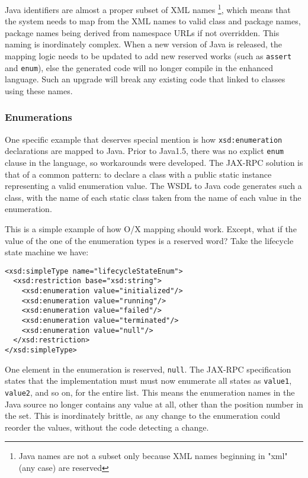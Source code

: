Java identifiers are almost a proper subset of XML names
\footnote{Java names are not a subset only because XML names beginning in "xml" (any case) are reserved},
which means that the system needs to map from the XML names to valid
class and package names, package names being derived from namespace URLs
if not overridden. This naming is inordinately complex. When a new version
of Java is released, the mapping logic needs to be updated to add new
reserved works (such as {\tt assert} and {\tt enum}), else the
generated code will no longer compile in the enhanced language. Such an
upgrade will break any existing code that linked to classes using these
names. 


\subsubsection{Enumerations}

One specific example that deserves special mention is how
{\tt xsd:enumeration} declarations are mapped to Java. Prior to
Java1.5, there was no explict {\tt enum} clause in the language, so
workarounds were developed. The JAX-RPC solution is that of a common
pattern: to declare a class with a public static instance representing
a valid enumeration value. The WSDL to Java code generates such a
class, with the name of each static class taken from the name of each
value in the enumeration. 

This is a simple example of how O/X mapping should work. Except, what if the
value of the one of the enumeration types is a reserved word?
Take the lifecycle state machine we have:

\begin{verbatim}
<xsd:simpleType name="lifecycleStateEnum">
  <xsd:restriction base="xsd:string"> 
    <xsd:enumeration value="initialized"/> 
    <xsd:enumeration value="running"/> 
    <xsd:enumeration value="failed"/> 
    <xsd:enumeration value="terminated"/> 
    <xsd:enumeration value="null"/> 
  </xsd:restriction>
</xsd:simpleType>
\end{verbatim}

One element in the enumeration is reserved, {\tt null}. The JAX-RPC
specification states that the implementation must must now enumerate all
states as {\tt value1}, {\tt value2}, and so on, for the entire list.
This means the enumeration names in the Java source no longer contains
any value at all, other than the position number in the set. This is
inordinately brittle, as any change to the enumeration could reorder the
values, without the code detecting a change.


